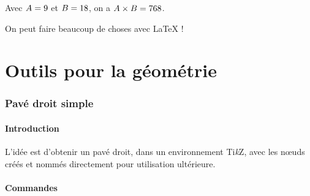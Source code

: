 \documentclass[a4paper,french,11pt]{article}
\providecommand\tikzlogo{Ti\textit{k}Z}
\let\TikZ\tikzlogo
\begin{document}
\begin{codetex}[]
\begin{PresentationCode}{}
\xdef\ValAleaA{\fpeval{randint(1,100)}}
\xdef\ValAleaB{\fpeval{randint(1,100)}}

Avec $A=\ValAleaA$ et $B=\ValAleaB$, on a $A\times B=\inteval{\ValAleaA * \ValAleaB}$.
\end{PresentationCode}

\begin{PresentationCode}[DarkBlue]{}
On peut faire beaucoup de choses avec \LaTeX{} !
\end{PresentationCode}
\end{codetex}

\pagebreak

\part{Outils pour la géométrie}

\section{Pavé droit \og simple \fg}\label{pave}

\subsection{Introduction}

\begin{codeidee}
L'idée est d'obtenir un pavé droit, dans un environnement \TikZ, avec les nœuds créés et nommés directement pour utilisation ultérieure.
\end{codeidee}

\subsection{Commandes}

\begin{codetex}
\end{codetex}
\end{document}
